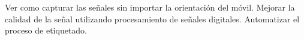 \begin{recomendations}
	Ver como capturar las señales sin importar la orientación del móvil.
	Mejorar la calidad de la señal utilizando procesamiento de señales digitales.
	Automatizar el proceso de etiquetado. 
\end{recomendations}
